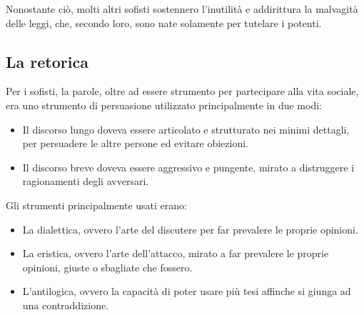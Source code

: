 \documentclass[10pt,a4paper]{article}
\begin{document}
	Nonostante ciò, molti altri sofisti sostennero l'inutilità e addirittura la malvagità delle leggi, che, secondo loro, sono nate solamente per tutelare i potenti.
	
	\subsection{La retorica}
	
	Per i sofisti, la parole, oltre ad essere strumento per partecipare alla vita sociale, era uno strumento di persuasione utilizzato principalmente in due modi:
	\begin{itemize}
		\item Il discorso lungo doveva essere articolato e strutturato nei minimi dettagli, per persuadere le altre persone ed evitare obiezioni.
		\item Il discorso breve doveva essere aggressivo e pungente, mirato a distruggere i ragionamenti degli avversari.
	\end{itemize}

	Gli strumenti principalmente usati erano:
	\begin{itemize}
		\item La dialettica, ovvero l'arte del discutere per far prevalere le proprie opinioni.
		\item La eristica, ovvero l'arte dell'attacco, mirato a far prevalere le proprie opinioni, giuste o sbagliate che fossero.
		\item L'antilogica, ovvero la capacità di poter usare più tesi affinche si giunga ad una contraddizione.
	\end{itemize}
	
\end{document}
